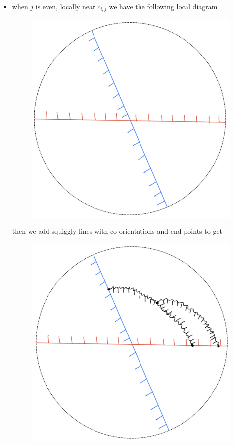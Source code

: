 \begin{definition}
\begin{enumerate}[label = (\roman*)]
\begin{itemize}
\item when $j$ is even, locally near $c_{i,j}$ we have the following local diagram
\begin{figure}[H] 
    \centering
    \includegraphics[scale = 0.55]{diagrams/local_systems_on_as_diagrams/6.png} 
    \caption{}
    \label{fig:your-label}
\end{figure}
then we add squiggly lines with co-orientations and end points to get
\begin{figure}[H] 
    \centering
    \includegraphics[scale = 0.55]{diagrams/local_systems_on_as_diagrams/7.png} 

\end{figure}
\end{itemize}
\end{enumerate}
\end{definition}
